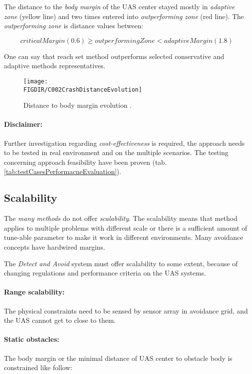 The distance to the \emph{body margin} of the UAS center stayed mostly in \emph{adaptive zone} (yellow line) and two times entered into \emph{outperforming zone} (red line). The \emph{outperforming zone} is distance values between:

\begin{equation*}
    critical Margin (0.6) \ge outperforming Zone < adaptive Margin (1.8)   
\end{equation*}

One can say that reach set method outperforms selected conservative and adaptive methods representatives.

\begin{figure}[H]
    \centering
    \texttt{[image: \\FIGDIR/C002CrashDistanceEvolution]} 
    \caption{Distance to body margin evolution \cite{hrdlik2018}.}
    \label{fig:crashDistanceEvolution}
\end{figure}

\paragraph{Disclaimer:} Further investigation regarding \emph{cost-effectiveness} is required, the approach needs to be tested in real environment and on the multiple scenarios. The testing concerning approach feasibility have been proven (tab. \ref{tab:testCasesPerformacneEvaluation}).

\subsection{Scalability}\label{s:conclusionScalability}
\noindent The \emph{many methods} do not offer \emph{scalability}. The scalability means that method applies to multiple problems with different scale or there is a sufficient amount of tune-able parameter to make it work in different environments. Many avoidance concepts have hardwired margins. 

The \emph{Detect and Avoid} system must offer scalability to some extent, because of changing regulations and performance criteria on the UAS systems.

\paragraph{Range scalability:} The physical constraints need to be sensed by sensor array in avoidance grid, and the UAS cannot get to close to them. 

\paragraph{Static obstacles:} The body margin or the minimal distance of UAS center to obstacle body is constrained like follow:

